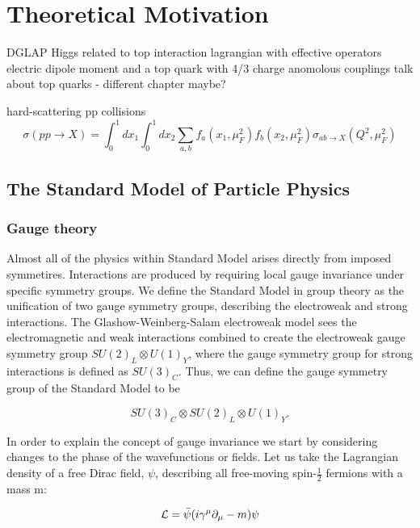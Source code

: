 \chapter{Theoretical Motivation} \label{chap-theory}

DGLAP
Higgs related to top
interaction lagrangian with effective operators
electric dipole moment and a top quark with 4/3 charge
anomolous couplings
talk about top quarks - different chapter maybe?

hard-scattering pp collisions
\begin{equation}
\sigma(pp \to X) = \int^1_0dx_1 \int^1_0dx_2 \sum_{a,b} f_a(x_1, \mu_F^2) f_b(x_2, \mu_F^2) \hat{\sigma}_{ab \to X}(Q^2, \mu_F^2)
\end{equation}

\section{The Standard Model of Particle Physics} \label{sec-StandardModel}

\subsection{Gauge theory}

Almost all of the physics within Standard Model arises directly from imposed symmetires. Interactions are produced by requiring local gauge invariance under specific symmetry groups. We define the Standard Model in group theory as the unification of two gauge symmetry groups, describing the electroweak and strong interactions. The Glashow-Weinberg-Salam electroweak model sees the electromagnetic and weak interactions combined to create the electroweak gauge symmetry group $SU(2)_L \otimes U(1)_Y$, where the gauge symmetry group for strong interactions is defined as $SU(3)_C$. Thus, we can define the gauge symmetry group of the Standard Model to be 

\begin{equation}
SU(3)_C \otimes SU(2)_L \otimes U(1)_Y.
\end{equation}

In order to explain the concept of gauge invariance we start by considering changes to the phase of the wavefunctions or fields. Let us take the Lagrangian density of a free Dirac field, $\psi$, describing all free-moving spin-$\frac{1}{2}$ fermions with a mass m:  

\begin{equation} \label{eqn-DiracLagrangian}
\mathcal{L} = \bar{\psi}(i \gamma^{\mu}\partial_{\mu}-m)\psi
\end{equation}

